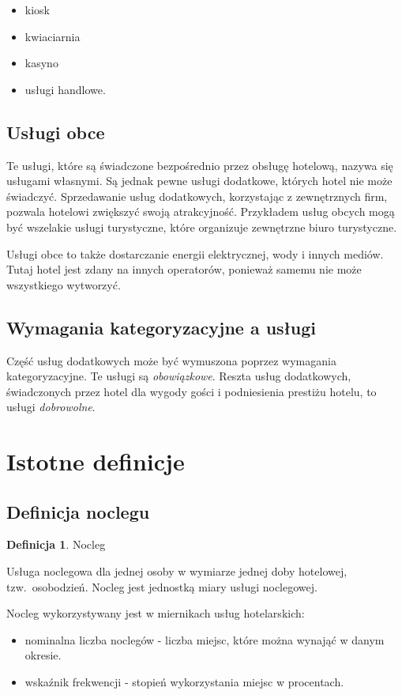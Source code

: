 \documentclass[a4paper,onecolumn,oneside,11pt,wide,floatssmall]{mwrep}
\theoremstyle{definition}
\newtheorem{defn}{Definicja}[section]
\theoremstyle{plain}%
\theoremstyle{remark}
\begin{document}
\begin{itemize}
  \item kiosk
  \item kwiaciarnia
  \item kasyno
  \item usługi handlowe.
\end{itemize}

\subsection{Usługi obce}
Te usługi, które są świadczone bezpośrednio przez obsługę hotelową, nazywa 
się usługami własnymi. Są jednak pewne usługi dodatkowe, których hotel nie 
może świadczyć. Sprzedawanie usług dodatkowych, 
korzystając z zewnętrznych firm, pozwala hotelowi zwiększyć swoją \mbox{atrakcyjność.} Przykładem usług obcych mogą być wszelakie usługi turystyczne, 
które organizuje zewnętrzne biuro turystyczne.

Usługi obce to także dostarczanie energii elektrycznej, wody i innych mediów.
 Tutaj hotel jest zdany na innych operatorów, ponieważ samemu nie może wszystkiego 
wytworzyć.

\subsection{Wymagania kategoryzacyjne a usługi}
Część usług dodatkowych może być wymuszona poprzez wymagania kategoryzacyjne.
 Te usługi są \emph{obowiązkowe}. Reszta usług dodatkowych, świadczonych 
 przez hotel dla wygody gości i podniesienia prestiżu 
 hotelu, to usługi \emph{dobrowolne}.

\section{Istotne definicje}
\subsection{Definicja noclegu}

\begin{defn}{Nocleg}

Usługa noclegowa dla jednej osoby w wymiarze jednej doby hotelowej, \mbox{tzw. 
osobodzień.} Nocleg jest jednostką miary usługi noclegowej.

\end{defn} 

Nocleg wykorzystywany jest w miernikach usług hotelarskich:
\begin{itemize}
  \item nominalna liczba noclegów - liczba miejsc, które można wynająć w 
  danym okresie.
  \item wskaźnik frekwencji - stopień wykorzystania miejsc w procentach.
\end{itemize}
\end{document}
